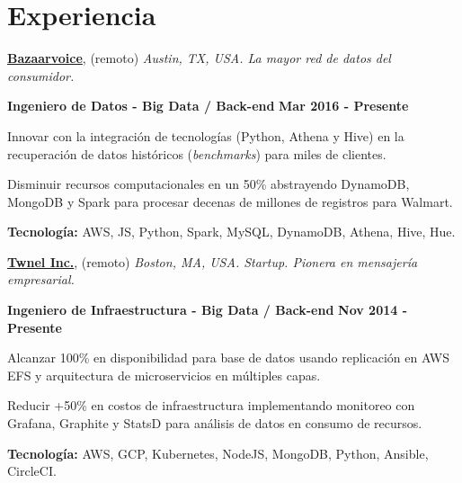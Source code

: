 \section{Experiencia}
%
\href{http://www.bazaarvoice.com/}{\textbf{Bazaarvoice}}, (remoto)
\textit{Austin, TX, USA. La mayor red de datos del consumidor.}

\begin{outerlist}
\item[\FA \faAngleDoubleRight] \textbf{Ingeniero de Datos -
Big Data / Back-end}
\hfill
\textbf{Mar 2016 - Presente}
\end{outerlist}

\begin{innerlist}
\item Innovar con la integración de tecnologías (Python, Athena y Hive) en la
recuperación de datos históricos (\textit{benchmarks}) para miles de clientes.
\item Disminuir recursos computacionales en un 50\% abstrayendo DynamoDB,
MongoDB y Spark para procesar decenas de millones de registros para Walmart.
\item \textbf{Tecnología:} AWS, JS, Python, Spark, MySQL, DynamoDB,
Athena, Hive, Hue.
\end{innerlist}

\quarterblankline

\href{http://www.twnel.com/}{\textbf{Twnel Inc.}}, (remoto) \textit{Boston, MA,
USA.
Startup.
Pionera en mensajería empresarial.}

\begin{outerlist}
\item[\FA \faAngleDoubleRight] \textbf{Ingeniero de Infraestructura -
Big Data / Back-end}
\hfill
\textbf{Nov 2014 - Presente}
\end{outerlist}

\begin{innerlist}
\item Alcanzar 100\% en disponibilidad para base de datos usando replicación en AWS EFS y arquitectura de microservicios en múltiples capas.
\item Reducir +50\% en costos de infraestructura implementando
monitoreo con Grafana, Graphite y StatsD para análisis de datos en consumo de
recursos.
\item \textbf{Tecnología:} AWS, GCP, Kubernetes, NodeJS,
MongoDB, Python, Ansible, CircleCI. %
\end{innerlist}

\quarterblankline

